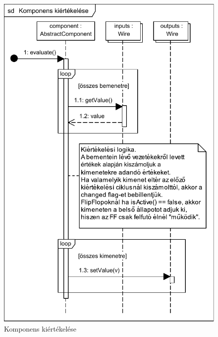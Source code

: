 \begin{figure}[H]
\begin{center}
\includegraphics{chapters/chapter04/seqdiagrams/new/evaluate.pdf}
\caption{Komponens kiértékelése}
\label{fig:evaluate}
\end{center}
\end{figure}

